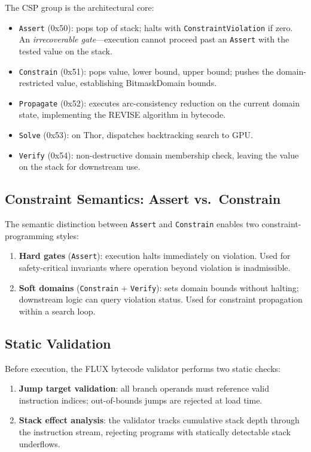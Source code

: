 \documentclass[sigplan,10pt,review]{acmart}
\begin{document}
\noindent The CSP group is the architectural core:

\begin{itemize}
  \item \texttt{Assert} (0x50): pops top of stack; halts with \texttt{ConstraintViolation}
    if zero. An \emph{irrecoverable gate}---execution cannot proceed past an \texttt{Assert}
    with the tested value on the stack.
  \item \texttt{Constrain} (0x51): pops value, lower bound, upper bound; pushes
    the domain-restricted value, establishing BitmaskDomain bounds.
  \item \texttt{Propagate} (0x52): executes arc-consistency reduction on the current
    domain state, implementing the REVISE algorithm in bytecode.
  \item \texttt{Solve} (0x53): on Thor, dispatches backtracking search to GPU.
  \item \texttt{Verify} (0x54): non-destructive domain membership check, leaving
    the value on the stack for downstream use.
\end{itemize}

\subsection{Constraint Semantics: Assert vs.\ Constrain}

The semantic distinction between \texttt{Assert} and \texttt{Constrain} enables
two constraint-programming styles:

\begin{enumerate}
  \item \textbf{Hard gates} (\texttt{Assert}): execution halts immediately on violation.
    Used for safety-critical invariants where operation beyond violation is inadmissible.
  \item \textbf{Soft domains} (\texttt{Constrain} + \texttt{Verify}): sets domain bounds
    without halting; downstream logic can query violation status. Used for constraint
    propagation within a search loop.
\end{enumerate}

\subsection{Static Validation}

Before execution, the FLUX bytecode validator performs two static checks:

\begin{enumerate}
  \item \textbf{Jump target validation}: all branch operands must reference valid instruction
    indices; out-of-bounds jumps are rejected at load time.
  \item \textbf{Stack effect analysis}: the validator tracks cumulative stack depth through
    the instruction stream, rejecting programs with statically detectable stack underflows.
\end{enumerate}
\end{document}
